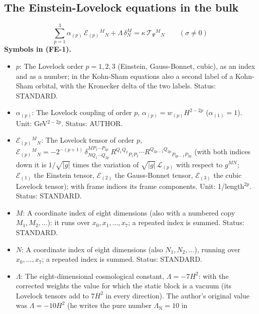 \documentclass[
  10pt,
]{article}
\providecommand{\tightlist}{%
  \setlength{\itemsep}{0pt}\setlength{\parskip}{0pt}}
\begin{document}
\hypertarget{the-einstein-lovelock-equations-in-the-bulk}{%
\subsection{The Einstein-Lovelock equations in the
bulk}\label{the-einstein-lovelock-equations-in-the-bulk}}

\[
\sum_{p=1}^{3}\alpha_{(p)}\,\mathcal{E}_{(p)}{}^M{}_N + \Lambda\,\delta^M_N
 = \kappa\,\mathcal{T}_\Psi{}^M{}_N\qquad (\sigma \ne 0) \tag{FE-1}
\] \textbf{Symbols in (FE-1).}

\begin{itemize}
\tightlist
\item
  \(p\): The Lovelock order \(p = 1, 2, 3\) (Einstein, Gauss-Bonnet,
  cubic), as an index and as a number; in the Kohn-Sham equations also a
  second label of a Kohn-Sham orbital, with the Kronecker delta of the
  two labels. Status: STANDARD.
\item
  \(\alpha_{(p)}\): The Lovelock coupling of order \(p\),
  \(\alpha_{(p)} = w_{(p)}H^{2-2p}\) (\(\alpha_{(1)} = 1\)). Unit:
  GeV\(^{2-2p}\). Status: AUTHOR.
\item
  \(\mathcal{E}_{(p)}{}^M{}_N\): The Lovelock tensor of order \(p\),
  \(\mathcal{E}_{(p)}{}^M{}_N = -2^{-(p+1)}\,\delta^{MP_1\cdots P_{2p}}_{NQ_1\cdots Q_{2p}}\,R^{Q_1Q_2}{}_{P_1P_2}\cdots R^{Q_{2p-1}Q_{2p}}{}_{P_{2p-1}P_{2p}}\)
  (with both indices down it is \(1/\sqrt{\lvert g\rvert}\) times the
  variation of \(\sqrt{\lvert g\rvert}\,\mathcal{L}_{(p)}\) with respect
  to \(g^{MN}\); \(\mathcal{E}_{(1)}\) the Einstein tensor,
  \(\mathcal{E}_{(2)}\) the Gauss-Bonnet tensor, \(\mathcal{E}_{(3)}\)
  the cubic Lovelock tensor); with frame indices its frame components.
  Unit: 1/length\(^{2p}\). Status: STANDARD.
\item
  \(M\): A coordinate index of eight dimensions (also with a numbered
  copy \(M_1, M_2, \dots\)): it runs over \(x_0, x_1, \dots, x_7\); a
  repeated index is summed. Status: STANDARD.
\item
  \(N\): A coordinate index of eight dimensions (also
  \(N_1, N_2, \dots\)), running over \(x_0, \dots, x_7\); a repeated
  index is summed. Status: STANDARD.
\item
  \(\Lambda\): The eight-dimensional cosmological constant,
  \(\Lambda = -7H^2\): with the corrected weights the value for which
  the static block is a vacuum (its Lovelock tensors add to \(7H^2\) in
  every direction). The author's original value was \(\Lambda = -10H^2\)
  (he writes the pure number \(\Lambda_{\mathrm{N}} = 10\) in

\end{itemize}
\end{document}
